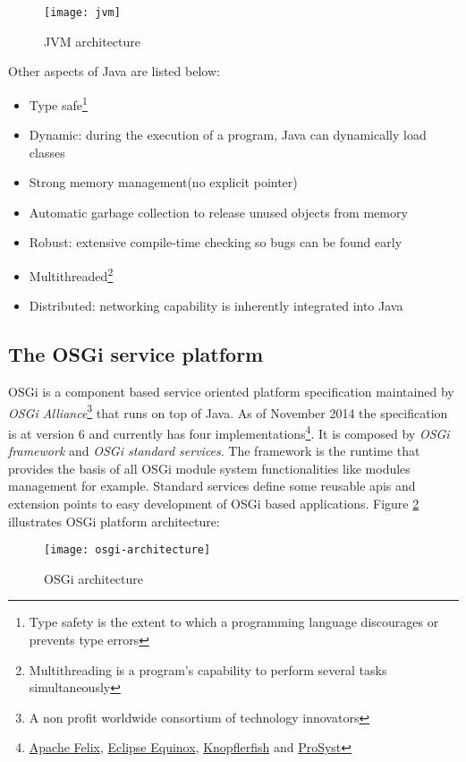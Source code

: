 \begin{figure}[h]
\caption{JVM architecture}
\label{jvm}
\centering
\texttt{[image: jvm]}
\end{figure}  
\FloatBarrier

Other aspects of Java are listed below:   

\begin{itemize}
\item Type safe\footnote{Type safety is the extent to which a programming language discourages or prevents type errors} 
\item Dynamic: during the execution of a program, Java can dynamically load classes 
\item Strong memory management(no explicit pointer)
\item Automatic garbage collection to release unused objects from memory
\item Robust: extensive compile-time checking so bugs can be found early
\item Multithreaded\footnote{Multithreading is a program’s capability to perform several tasks simultaneously}
\item Distributed: networking capability is inherently integrated into Java
\end{itemize}

\subsection{The OSGi service platform}
OSGi is a component based service oriented platform specification maintained by \emph{OSGi Alliance}\footnote{A non profit worldwide consortium of technology innovators} that runs on top of Java. As of November 2014 the specification is at version 6 and currently has four implementations\footnote{\href{http://felix.apache.org}{Apache Felix}, \href{http://eclipse.org/equinox/}{Eclipse Equinox}, \href{http://www.knopflerfish.org}{Knopflerfish} and \href{http://www.prosyst.com}{ProSyst}}. It is composed by \emph{OSGi framework} and \emph{OSGi standard services}. The framework is the runtime that provides the basis of all OSGi module system functionalities like modules management for example. Standard services define some reusable apis and extension points to easy development of OSGi based applications. Figure \ref{osgi architecture} illustrates OSGi platform architecture:

\begin{figure}[h]
\caption{OSGi architecture}
\label{osgi architecture}
\centering
\texttt{[image: osgi-architecture]}
\end{figure}  
\FloatBarrier



